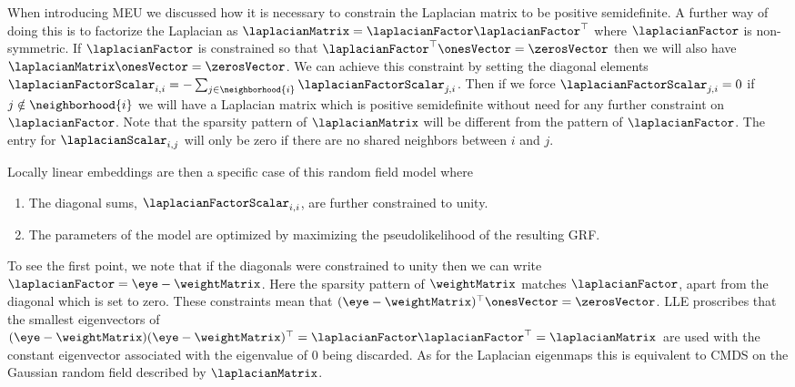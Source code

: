 When introducing MEU we discussed how it is necessary to constrain the
Laplacian matrix to be positive semidefinite. A further way of doing
this is to factorize the Laplacian as $\laplacianMatrix =
\laplacianFactor\laplacianFactor^\top$ where $\laplacianFactor$ is
non-symmetric.  If $\laplacianFactor$ is constrained so that
$\laplacianFactor^\top\onesVector = \zerosVector$ then we will also
have $\laplacianMatrix\onesVector=\zerosVector$. We can achieve this
constraint by setting the diagonal elements
$\laplacianFactorScalar_{i,i} = -\sum_{j\in\neighborhood{i}}
\laplacianFactorScalar_{j, i}$. Then if we force
$\laplacianFactorScalar_{j,i}=0$ if $j\notin\neighborhood{i}$ we will
have a Laplacian matrix which is positive semidefinite without need
for any further constraint on $\laplacianFactor$. Note that the
sparsity pattern of $\laplacianMatrix$ will be different from the
pattern of $\laplacianFactor$. The entry for
$\laplacianScalar_{i,j}$ will only be zero if there are no shared
neighbors between $i$ and $j$.

Locally linear embeddings \citep{Roweis:lle00} are then a specific
case of this random field model where
\begin{enumerate}
  \item The diagonal sums, $\laplacianFactorScalar_{i,i}$, are further constrained to unity.
  \item The parameters of the model are optimized by maximizing the pseudolikelihood  of the resulting GRF.
\end{enumerate}
To see the first point, we note that if the diagonals were constrained
to unity then we can write $\laplacianFactor = \eye -
\weightMatrix$. Here the sparsity pattern of $\weightMatrix$ matches
$\laplacianFactor$, apart from the diagonal which is set to zero. These constraints mean that $(\eye - \weightMatrix)^\top \onesVector =
\zerosVector$. LLE proscribes that the smallest eigenvectors of $(\eye
- \weightMatrix)(\eye - \weightMatrix)^\top =
\laplacianFactor\laplacianFactor^\top = \laplacianMatrix$ are used
with the constant eigenvector associated with the eigenvalue of 0
being discarded. As for the Laplacian eigenmaps this is equivalent to
CMDS on the Gaussian random field described by $\laplacianMatrix$.

